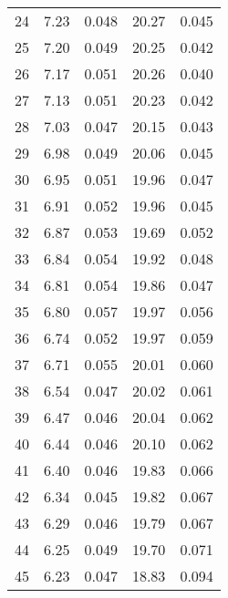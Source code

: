 \begin{table}
\begin{tabular}{c|ll|ll}
24 & 7.23 & 0.048 & 20.27 & 0.045 \\
25 & 7.20 & 0.049 & 20.25 & 0.042 \\
26 & 7.17 & 0.051 & 20.26 & 0.040 \\
27 & 7.13 & 0.051 & 20.23 & 0.042 \\
28 & 7.03 & 0.047 & 20.15 & 0.043 \\
29 & 6.98 & 0.049 & 20.06 & 0.045 \\
30 & 6.95 & 0.051 & 19.96 & 0.047 \\
31 & 6.91 & 0.052 & 19.96 & 0.045 \\
32 & 6.87 & 0.053 & 19.69 & 0.052 \\
33 & 6.84 & 0.054 & 19.92 & 0.048 \\
34 & 6.81 & 0.054 & 19.86 & 0.047 \\
35 & 6.80 & 0.057 & 19.97 & 0.056 \\
36 & 6.74 & 0.052 & 19.97 & 0.059 \\
37 & 6.71 & 0.055 & 20.01 & 0.060 \\
38 & 6.54 & 0.047 & 20.02 & 0.061 \\
39 & 6.47 & 0.046 & 20.04 & 0.062 \\
40 & 6.44 & 0.046 & 20.10 & 0.062 \\
41 & 6.40 & 0.046 & 19.83 & 0.066 \\
42 & 6.34 & 0.045 & 19.82 & 0.067 \\
43 & 6.29 & 0.046 & 19.79 & 0.067 \\
44 & 6.25 & 0.049 & 19.70 & 0.071 \\
45 & 6.23 & 0.047 & 18.83 & 0.094 \\
               \hline
        \end{tabular}
    \end{table}
    \clearpage


